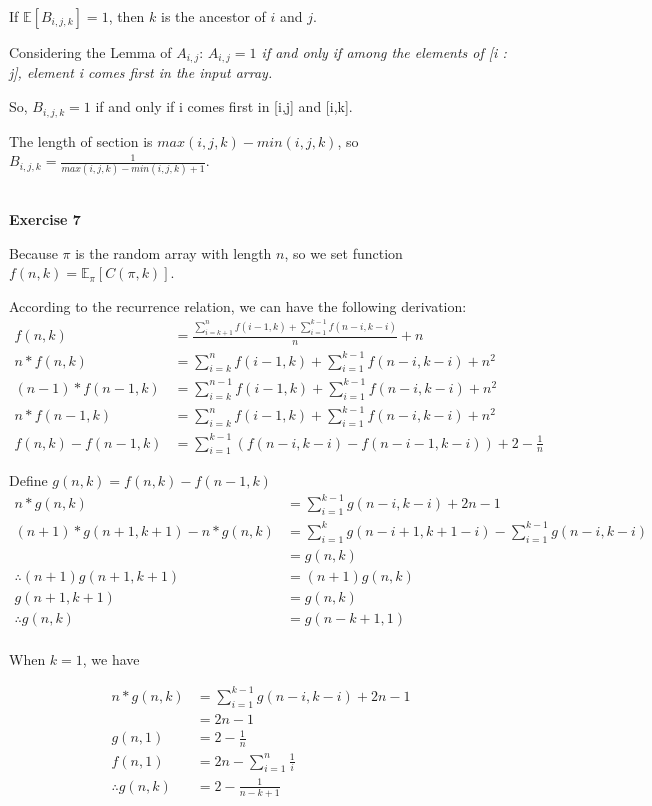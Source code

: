\documentclass{article}
\begin{document}
If $\mathds{E}[ B_{i,j,k}] = 1$, then $k$ is the ancestor of $i$ and $j$.

Considering the Lemma of $A_{i,j}$: \textit{ $A_{i,j} = 1$ if and only if among the elements of
[i : j], element i comes first in the input array.}

So, $B_{i,j,k} = 1$ if and only if i comes first in [i,j] and [i,k].

The length of section is $max(i,j,k) - min(i,j,k)$, so $B_{i,j,k} = \frac{1}{max(i,j,k) - min(i,j,k) + 1}$.

~\\
\textbf{Exercise 7}

Because $\pi$ is the random array with length $n$, so we set function $f(n,k) = \mathds{E}_{\pi} [ C(\pi , k)]$.

According to the recurrence relation, we can have the following derivation:
\begin{align}
    f(n,k) &= \frac{  \sum_{i=k+1}^{n} f(i-1,k)   + \sum_{i=1}^{k-1} f(n-i, k-i)   }{n} + n\\
    n*f(n,k) &=  \sum_{i=k}^{n} f(i-1,k)   + \sum_{i=1}^{k-1} f(n-i, k-i)    + n^2\\
    (n-1)*f(n-1,k) &=  \sum_{i=k}^{n-1} f(i-1,k)   + \sum_{i=1}^{k-1} f(n-i, k-i)    + n^2\\
    n*f(n-1,k) &=  \sum_{i=k}^{n} f(i-1,k)   + \sum_{i=1}^{k-1} f(n-i, k-i)    + n^2\\
    f(n,k) - f(n-1,k) &= \sum_{i=1}^{k-1} ( f(n-i, k-i) - f(n-i-1, k-i)  ) + 2 - \frac{1}{n}
\end{align}

    Define $g(n,k) = f(n,k) - f(n-1,k)$
\begin{align}
    n*g(n,k) &= \sum_{i=1}^{k-1} g(n-i,k-i) + 2n - 1\\
    (n+1)*g(n+1,k+1) - n*g(n,k) &= \sum_{i=1}^{k} g(n-i+1, k+1-i) - \sum_{i=1}^{k-1} g(n-i,k-i)\\
    &= g(n,k)\\
    \therefore (n+1)g(n+1,k+1) &= (n+1)g(n,k)\\
    g(n+1,k+1) &= g(n,k)\\
    \therefore g(n,k)&=g(n-k+1,1)\\
\end{align}

    When $k=1$, we have
    
\begin{align}    
    n*g(n,k) &= \sum_{i=1}^{k-1} g(n-i,k-i) + 2n - 1\\
    &= 2n-1\\
    g(n,1) &= 2 - \frac{1}{n}\\
    f(n,1) &= 2n - \sum_{i=1}^{n} \frac{1}{i}\\ 
    \therefore g(n,k) &= 2-\frac{1}{n-k+1}
\end{align}
\end{document}

